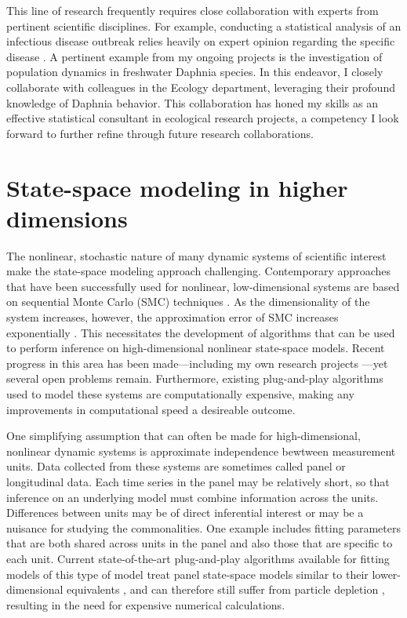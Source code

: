 \documentclass{article}
\begin{document}
This line of research frequently requires close collaboration with experts from pertinent scientific disciplines.
For example, conducting a statistical analysis of an infectious disease outbreak relies heavily on expert opinion regarding the specific disease \cite{wheeler24}.
A pertinent example from my ongoing projects is the investigation of population dynamics in freshwater Daphnia species.
In this endeavor, I closely collaborate with colleagues in the Ecology department, leveraging their profound knowledge of Daphnia behavior.
This collaboration has honed my skills as an effective statistical consultant in ecological research projects, a competency I look forward to further refine through future research collaborations.


\section{State-space modeling in higher dimensions}\label{sec:methods}

The nonlinear, stochastic nature of many dynamic systems of scientific interest make the state-space modeling approach challenging.
Contemporary approaches that have been successfully used for nonlinear, low-dimensional systems are based on sequential Monte Carlo (SMC) techniques \cite{ionides06,andrieu10,ionides15}.
As the dimensionality of the system increases, however, the approximation error of SMC increases exponentially \cite{bengtsson08,snyder08}.
This necessitates the development of algorithms that can be used to perform inference on high-dimensional nonlinear state-space models.
Recent progress in this area has been made---including my own research projects \cite{ionides22,wheeler24}---yet several open problems remain.
Furthermore, existing plug-and-play algorithms used to model these systems are computationally expensive, making any improvements in computational speed a desireable outcome.

One simplifying assumption that can often be made for high-dimensional, nonlinear dynamic systems is approximate independence bewtween measurement units.
Data collected from these systems are sometimes called panel or longitudinal data.
Each time series in the panel may be relatively short, so that inference on an underlying model must combine information across the units.
Differences between units may be of direct inferential interest or may be a nuisance for studying the commonalities.
One example includes fitting parameters that are both shared across units in the panel and also those that are specific to each unit.
Current state-of-the-art plug-and-play algorithms available for fitting models of this type of model treat panel state-space models similar to their lower-dimensional equivalents \cite{breto20}, and can therefore still suffer from particle depletion \cite{snyder08}, resulting in the need for expensive numerical calculations.
\end{document}
